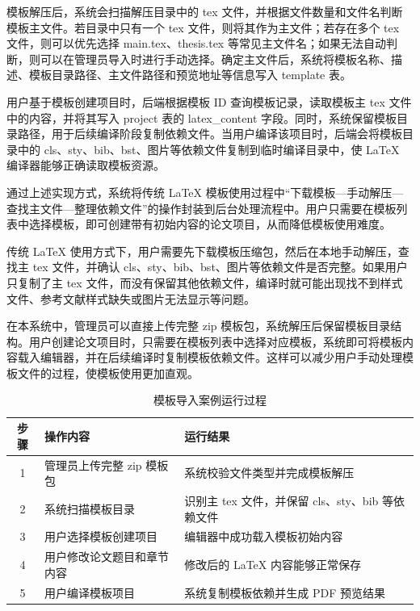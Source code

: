 \documentclass{xduugthesis}
\begin{document}
模板解压后，系统会扫描解压目录中的 tex 文件，并根据文件数量和文件名判断模板主文件。若目录中只有一个 tex 文件，则将其作为主文件；若存在多个 tex 文件，则可以优先选择 main.tex、thesis.tex 等常见主文件名；如果无法自动判断，则可以在管理员导入时进行手动选择。确定主文件后，系统将模板名称、描述、模板目录路径、主文件路径和预览地址等信息写入 template 表。

用户基于模板创建项目时，后端根据模板 ID 查询模板记录，读取模板主 tex 文件中的内容，并将其写入 project 表的 latex\_content 字段。同时，系统保留模板目录路径，用于后续编译阶段复制依赖文件。当用户编译该项目时，后端会将模板目录中的 cls、sty、bib、bst、图片等依赖文件复制到临时编译目录中，使 LaTeX 编译器能够正确读取模板资源。

通过上述实现方式，系统将传统 LaTeX 模板使用过程中“下载模板—手动解压—查找主文件—整理依赖文件”的操作封装到后台处理流程中。用户只需要在模板列表中选择模板，即可创建带有初始内容的论文项目，从而降低模板使用难度。

传统 LaTeX 使用方式下，用户需要先下载模板压缩包，然后在本地手动解压，查找主 tex 文件，并确认 cls、sty、bib、bst、图片等依赖文件是否完整。如果用户只复制了主 tex 文件，而没有保留其他依赖文件，编译时就可能出现找不到样式文件、参考文献样式缺失或图片无法显示等问题。

在本系统中，管理员可以直接上传完整 zip 模板包，系统解压后保留模板目录结构。用户创建论文项目时，只需要在模板列表中选择对应模板，系统即可将模板内容载入编辑器，并在后续编译时复制模板依赖文件。这样可以减少用户手动处理模板文件的过程，使模板使用更加直观。

\begin{table}[!ht]
    \centering
    \caption{模板导入案例运行过程}
    \label{tab:template-import-case}
    \begin{tabular}{|c|p{5cm}|p{6cm}|}
        \hline
        步骤 & 操作内容 & 运行结果 \\
        \hline
        1 & 管理员上传完整 zip 模板包 & 系统校验文件类型并完成模板解压 \\
        \hline
        2 & 系统扫描模板目录 & 识别主 tex 文件，并保留 cls、sty、bib 等依赖文件 \\
        \hline
        3 & 用户选择模板创建项目 & 编辑器中成功载入模板初始内容 \\
        \hline
        4 & 用户修改论文题目和章节内容 & 修改后的 LaTeX 内容能够正常保存 \\
        \hline
        5 & 用户编译模板项目 & 系统复制模板依赖并生成 PDF 预览结果 \\
        \hline
    \end{tabular}
\end{table}
\end{document}
